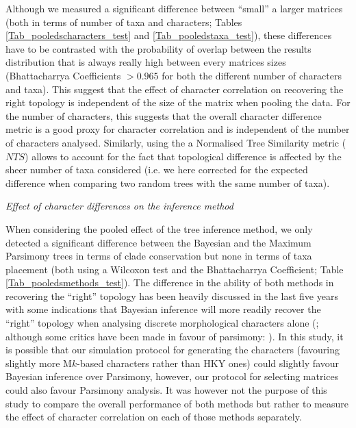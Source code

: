 \documentclass[12pt,letterpaper]{article}
\renewcommand{\subsection}[1]{%
\bigskip
\begin{center}
\begin{large}
\normalfont\itshape #1
\end{large}
\end{center}}
\begin{document}
Although we measured a significant difference between ``small'' a larger matrices (both in terms of number of taxa and characters; Tables \ref{Tab_pooledscharacters_test} and \ref{Tab_pooledstaxa_test}), these differences have to be contrasted with the probability of overlap between the results distribution that is always really high between every matrices sizes (Bhattacharrya Coefficients $>0.965$ for both the different number of characters and taxa).
This suggest that the effect of character correlation on recovering the right topology is independent of the size of the matrix when pooling the data.
For the number of characters, this suggests that the overall character difference metric is a good proxy for character correlation and is independent of the number of characters analysed.
Similarly, using the a Normalised Tree Similarity metric ($NTS$) allows to account for the fact that topological difference is affected by the sheer number of taxa considered (i.e. we here corrected for the expected difference when comparing two random trees with the same number of taxa).

\subsection{Effect of character differences on the inference method}
When considering the pooled effect of the tree inference method, we only detected a significant difference between the Bayesian and the Maximum Parsimony trees in terms of clade conservation but none in terms of taxa placement (both using a Wilcoxon test and the Bhattacharrya Coefficient; Table \ref{Tab_pooledsmethods_test}).
The difference in the ability of both methods in recovering the ``right'' topology has been heavily discussed in the last five years with some indications that Bayesian inference will more readily recover the ``right'' topology when analysing discrete morphological characters alone (\citealt{wrightbayesian2014,OReilly20160081,puttick2017uncertain}; although some critics have been made in favour of parsimony: \citealt{spencerefficacy2013,goloboff2017weighted}).
In this study, it is possible that our simulation protocol for generating the characters (favouring slightly more M$k$-based characters rather than HKY ones) could slightly favour Bayesian inference over Parsimony, however, our protocol for selecting matrices \citep[i.e. those with in a $CI>0.26$ in a quick preliminary parsimony search;][]{OReilly20160081} could also favour Parsimony analysis.
It was however not the purpose of this study to compare the overall performance of both methods but rather to measure the effect of character correlation on each of those methods separately.
\end{document}
